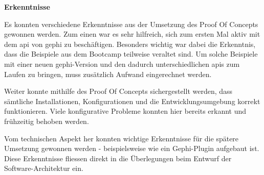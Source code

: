 \textbf{Erkenntnisse}

Es konnten verschiedene Erkenntnisse aus der Umsetzung des Proof Of Concepts gewonnen werden.
Zum einen war es sehr hilfreich, sich zum ersten Mal aktiv mit dem \acs{api} von \acs{gephi} zu beschäftigen. Besonders wichtig war
dabei die Erkenntnis, dass die Beispiele aus dem Bootcamp teilweise veraltet sind. Um solche Beispiele mit einer neuen \acs{gephi}-Version
und den dadurch unterschiedlichen \acs{api}s zum Laufen zu bringen, muss zusätzlich Aufwand eingerechnet werden.

Weiter konnte mithilfe des Proof Of Concepts sichergestellt werden, dass sämtliche Installationen, Konfigurationen und die
Entwicklungsumgebung korrekt funktionieren. Viele konfigurative Probleme konnten hier bereits erkannt und frühzeitig behoben werden.

Vom technischen Aspekt her konnten wichtige Erkenntnisse für die spätere Umsetzung gewonnen werden - beispielsweise
wie ein Gephi-Plugin aufgebaut ist. Diese Erkenntnisse fliessen direkt in die Überlegungen beim Entwurf der Software-Architektur ein.

